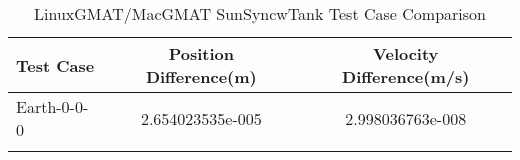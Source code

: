 \begin{table}[htbp!]
\centering
\caption{ LinuxGMAT/MacGMAT SunSyncwTank Test Case Comparison}
      \begin{tabular}{lcc}
      \hline\hline
          Test Case & Position Difference(m) & Velocity Difference(m/s) \\
         \hline
         Earth-0-0-0 & 2.654023535e-005 & 2.998036763e-008 \\
      \hline\hline
      \label{Table: SunSyncwTank LinuxGMAT-MacGMAT Table} 
\end{tabular}
\end{table}
